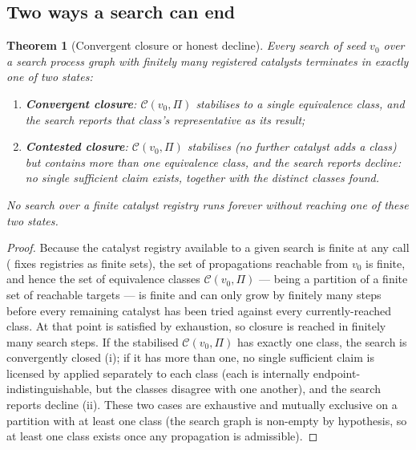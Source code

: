 \documentclass[11pt,twocolumn,a4paper]{article}
\theoremstyle{thmstyle}
\newtheorem{theorem}{Theorem}[section]
\theoremstyle{definition}
\theoremstyle{remark}
\newcommand{\Proc}{\Pi}
\newcommand{\Cell}{\mathcal{C}}
\begin{document}
\subsection{Two ways a search can end}

\begin{theorem}[Convergent closure or honest decline]
\label{thm:decline}
Every search of seed $v_0$ over a search process graph with finitely many
registered catalysts terminates in exactly one of two states:
\begin{enumerate}[label=\textup{(\roman*)},leftmargin=2.2em]
\item \textbf{Convergent closure}: $\Cell(v_0,\Proc)$ stabilises to a
single equivalence class, and the search reports that class's
representative as its result;
\item \textbf{Contested closure}: $\Cell(v_0,\Proc)$ stabilises (no further
catalyst adds a class) but contains more than one equivalence class, and
the search reports \emph{decline}: no single sufficient claim exists,
together with the distinct classes found.
\end{enumerate}
No search over a finite catalyst registry runs forever without reaching
one of these two states.
\end{theorem}

\begin{proof}
Because the catalyst registry available to a given search is finite at any
call ( fixes registries as finite sets), the set
of propagations reachable from $v_0$ is finite, and hence the set of
equivalence classes $\Cell(v_0,\Proc)$ --- being a partition of a finite
set of reachable targets --- is finite and can only grow by finitely many
steps before every remaining catalyst has been tried against every
currently-reached class. At that point  is satisfied by
exhaustion, so closure is reached in finitely many search steps. If the
stabilised $\Cell(v_0,\Proc)$ has exactly one class, the search is
convergently closed (i); if it has more than one, no single sufficient
claim is licensed by  applied separately to each class
(each is internally endpoint-indistinguishable, but the classes disagree
with one another), and the search reports decline (ii). These two cases
are exhaustive and mutually exclusive on a partition with at least one
class (the search graph is non-empty by hypothesis, so at least one class
exists once any propagation is admissible).
\end{proof}
\end{document}
